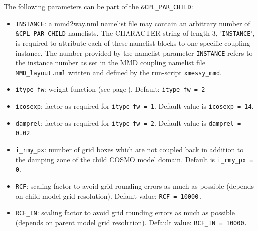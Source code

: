 \documentclass[11pt,twoside]{article}
\begin{document}
The following parameters can be part of the \verb|&CPL_PAR_CHILD|:
\begin{itemize}
\item \verb|INSTANCE|: a mmd2way.nml namelist file may contain an arbitrary
number of \verb|&CPL_PAR_CHILD| namelists. The {\footnotesize CHARACTER} string
of length 3, '\verb|INSTANCE|', is required to attribute each of these namelist
blocks to one specific coupling instance. The number provided by
the namelist parameter \verb|INSTANCE| refers to the instance number as set in the MMD
coupling namelist file \verb|MMD_layout.nml| written and defined by the run-script \verb|xmessy_mmd|. 
\item \verb|itype_fw|: weight function (see
page \pageref{descript:itype_fw}).
 Default: \verb|itype_fw = 2|
\item \verb|icosexp|: factor as required for \verb|itype_fw = 1|. Default value
is \verb|icosexp = 14|.
\item \verb|damprel|: factor as required for \verb|itype_fw = 2|. Default value
is \verb|damprel = 0.02|.

\item \verb|i_rmy_px|: number of grid boxes which are not coupled back in
addition to the damping zone of the child COSMO model domain. Default
is \verb|i_rmy_px = 0|.

\item \verb|RCF|: scaling factor to avoid grid rounding errors as much as
possible (depends on child model grid resolution). Default value: \verb|RCF = 10000.|
\item \verb|RCF_IN|: scaling factor to avoid grid rounding errors as much as
possible (depends on parent model grid resolution). Default value: \verb|RCF_IN = 10000.|


\end{itemize}
\end{document}
